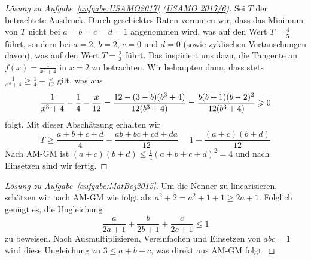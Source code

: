 \begin{proof}[Lösung zu Aufgabe~\ref{aufgabe:USAMO2017} \textmd{(\href{https://artofproblemsolving.com/community/c439884_2017_usamo}{USAMO 2017/6})}]
	Sei $T$ der betrachtete Ausdruck. Durch geschicktes Raten vermuten wir, dass das Minimum von $T$ nicht bei $a=b=c=d=1$ angenommen wird, was auf den Wert $T=\frac45$ führt, sondern bei $a=2$, $b=2$, $c=0$ und $d=0$ (sowie zyklischen Vertauschungen davon), was auf den Wert $T=\frac23$ führt. Das inspiriert uns dazu, die Tangente an $f(x)=\frac{1}{x^3+4}$ in $x=2$ zu betrachten. Wir behaupten dann, dass stets $ \frac{1}{x^3+4}\geqslant \frac14-\frac{x}{12}$ gilt, was aus
	\begin{equation*}
		\frac1{x^3+4}-\frac14-\frac{x}{12}=\frac {12-(3-b)(b^3+4)}{12(b^3+4)}=\frac{b(b+1)(b-2)^2}{12\parens*{b^3+4}}\geqslant 0
	\end{equation*}
	folgt. Mit dieser Abschätzung erhalten wir
	\begin{equation*}
		T\geqslant \frac{a+b+c+d}4-\frac{ab+bc+cd+da}{12}=1-\frac{(a+c)(b+d)}{12}
	\end{equation*}
	Nach AM-GM ist $(a+c)(b+d)\leqslant \frac14(a+b+c+d)^2=4$ und nach Einsetzen sind wir fertig.
\end{proof}
\begin{proof}[Lösung zu Aufgabe~\ref{aufgabe:MatBoj2015}]
	Um die Nenner zu linearisieren, schätzen wir nach AM-GM wie folgt ab: $a^2+2=a^2+1+1\geqslant 2a+1$. Folglich genügt es, die Ungleichung
	\begin{equation*}
		\frac{a}{2a+1}+\frac{b}{2b+1}+\frac{c}{2c+1}\leqslant 1
	\end{equation*}
	zu beweisen. Nach Ausmultiplizieren, Vereinfachen und Einsetzen von $abc=1$ wird diese Ungleichung zu $3\leqslant a+b+c$, was direkt aus AM-GM folgt.
\end{proof}
